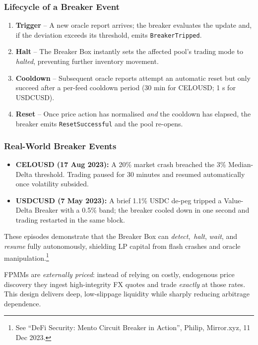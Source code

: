 \documentclass[a4paper]{article}
\providecommand{\hyp}{-}
\theoremstyle{definition}
\begin{document}
\subsubsection*{Lifecycle of a Breaker Event}
\begin{enumerate}[leftmargin=*]
  \item \textbf{Trigger} – A new oracle report arrives; the breaker evaluates
        the update and, if the deviation exceeds its threshold, emits
        \verb|BreakerTripped|.
  \item \textbf{Halt} – The Breaker Box instantly sets the affected pool's
        trading mode to \textit{halted}, preventing further inventory movement.
  \item \textbf{Cooldown} – Subsequent oracle reports attempt an automatic
        reset but only succeed after a per\hyp feed cooldown period (30 min for
        CELO\/USD; 1 s for USDC\/USD).
  \item \textbf{Reset} – Once price action has normalised \emph{and} the
        cooldown has elapsed, the breaker emits \verb|ResetSuccessful| and the
        pool re\hyp opens.
\end{enumerate}

\subsubsection*{Real\hyp World Breaker Events}
\begin{itemize}[leftmargin=*]
  \item \textbf{CELO\/USD (17 Aug 2023):} A 20\% market crash breached the 3\%
        Median\hyp Delta threshold. Trading paused for 30 minutes and resumed
        automatically once volatility subsided.
  \item \textbf{USDC\/USD (7 May 2023):} A brief 1.1\% USDC de\hyp peg tripped a
        Value\hyp Delta Breaker with a 0.5\% band; the breaker cooled down in
        one second and trading restarted in the same block.
\end{itemize}

These episodes demonstrate that the Breaker Box can \emph{detect},\
\emph{halt}, \emph{wait}, and \emph{resume} fully autonomously, shielding LP
capital from flash crashes and oracle manipulation.\footnote{See ``DeFi
Security: Mento Circuit Breaker in Action'', Philip, Mirror.xyz, 11 Dec 2023.}

 FPMMs are \emph{externally priced}: instead of relying on costly, endogenous price discovery they ingest high-integrity FX quotes and trade \emph{exactly} at those rates.  This design delivers deep, low-slippage liquidity while sharply reducing arbitrage dependence.
\end{document}
